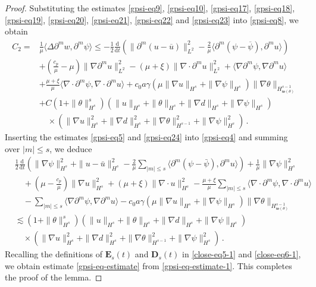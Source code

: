\documentclass[reqno,11pt]{amsart}
\numberwithin{equation}{section}
\def\d{\mathrm{d}}
\def\no{\nonumber}
\def\w{\mathfrak{w}}
\begin{document}
\begin{proof}
Substituting the estimates \eqref{gpsi-eq9}, \eqref{gpsi-eq10}, \eqref{gpsi-eq17}, \eqref{gpsi-eq18}, \eqref{gpsi-eq19}, \eqref{gpsi-eq20}, \eqref{gpsi-eq21}, \eqref{gpsi-eq22} and \eqref{gpsi-eq23} into \eqref{gpsi-eq8}, we obtain
\begin{equation}\label{gpsi-eq24}
\begin{aligned}
C_2 = &\frac{1}{\mu} \langle \Delta \partial^m w, \partial^m \psi \rangle \leq -\frac{1}{2} \frac{\d}{\d t} \left( \|\partial^m(u-\overline{u})\|_{L^2}^2 - \frac{2}{\mu} \langle \partial^m(\psi - \overline{\psi}), \partial^m u \rangle \right) \\
& + ( \frac{c_p}{\mu} - \mu ) \|\nabla \partial^m u\|_{L^2}^2 - (\mu+\xi) \|\nabla\cdot \partial^m u\|_{L^2}^2 + \langle \nabla \partial^m \psi, \nabla \partial^m u \rangle \\
& + \frac{\mu+\xi}{\mu} \langle \nabla \cdot\partial^m \psi, \nabla \cdot\partial^m u \rangle + c_0 a \gamma ( \mu \| \nabla u \|_{H^s} + \| \nabla \psi \|_{H^s} ) \| \nabla \theta \|_{H^{s-1}_{\w (\theta)}}\\
& + C (1 + \|\theta\|_{H^s}^s) (\|u\|_{H^s} + \|\theta\|_{H^s} + \|\nabla d\|_{H^s} + \|\nabla \psi\|_{H^s}) \\
&\quad \times (\|\nabla u\|_{H^s}^2 + \|\nabla d\|_{H^s}^2 + \|\nabla \theta\|_{H^{s-1}}^2 + \|\nabla \psi\|_{H^s}^2) \,.
\end{aligned}
\end{equation}
Inserting the estimates \eqref{gpsi-eq5} and \eqref{gpsi-eq24} into \eqref{gpsi-eq4} and summing over $|m|\le s$, we deduce
\begin{align}\label{gpsi-eq-estimate-1}
\no &\frac{1}{2} \frac{\d}{\d t} \left( \|\nabla \psi\|_{H^s}^2 + \|u - \bar{u}\|_{H^s}^2 - \frac{2}{\mu} \sum_{|m| \leq s} \langle \partial^m (\psi - \bar{\psi}), \partial^m u \rangle \right) + \frac{1}{ \mu} \|\nabla \psi\|_{H^s}^2 \\
\no & \quad + ( \mu - \frac{c_p}{\mu} ) \|\nabla u\|_{H^s}^2 + (\mu + \xi) \|\nabla \cdot u\|_{H^s}^2 - \frac{\mu + \xi}{\mu} \sum_{|m| \leq s} \langle \nabla \cdot \partial^m \psi, \nabla \cdot \partial^m u \rangle \\
& \quad- \sum_{|m| \leq s} \langle \nabla \partial^m \psi, \nabla \partial^m u \rangle - c_0 a \gamma ( \mu \| \nabla u \|_{H^s} + \| \nabla \psi \|_{H^s} ) \| \nabla \theta \|_{H^{s-1}_{\w (\theta)}} \\
\no & \lesssim \left( 1 + \|\theta\|_{H^s}^s \right) \left( \|u\|_{H^s} + \|\theta\|_{H^s} + \|\nabla d\|_{H^s} + \|\nabla \psi\|_{H^s} \right) \\
\no & \quad\times \left( \|\nabla u\|_{H^s}^2 + \|\nabla d\|_{H^s}^2 + \|\nabla \theta\|_{H^{s-1}}^2 + \|\nabla \psi\|_{H^s}^2 \right) \,.
\end{align}
Recalling the definitions of $\mathbf{E}_s(t)$ and $\mathbf{D}_s(t)$ in \eqref{close-eq5-1} and \eqref{close-eq6-1}, we obtain estimate \eqref{gpsi-eq-estimate} from \eqref{gpsi-eq-estimate-1}. This completes the proof of the lemma.
\end{proof}
\end{document}
